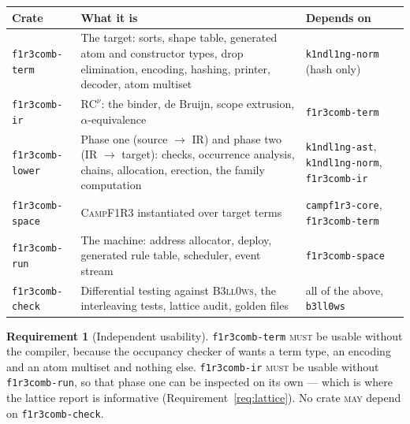 \documentclass[11pt,a4paper]{article}
\newcommand{\code}[1]{\texttt{#1}}
\newcommand{\Camp}{\textsc{CampF1R3}}
\newcommand{\Bell}{\textsc{B3ll0ws}}
\newcommand{\MUST}{\textsc{must}}
\newcommand{\MAY}{\textsc{may}}
\theoremstyle{definition}
\newtheorem{requirement}[definition]{Requirement}
\theoremstyle{plain}
\begin{document}
\begin{center}
\begin{tabularx}{\linewidth}{@{}l>{\raggedright\arraybackslash}Xl@{}}
\toprule
Crate & What it is & Depends on\\
\midrule
\code{f1r3comb-term} & The target: sorts, shape table, generated atom and
constructor types, drop elimination, encoding, hashing, printer, decoder,
atom multiset & \code{k1ndl1ng-norm} (hash only)\\
\code{f1r3comb-ir} & $\mathrm{RC}^{\nu}$: the binder, de Bruijn, scope
extrusion, $\alpha$-equivalence & \code{f1r3comb-term}\\
\code{f1r3comb-lower} & Phase one (source $\to$ IR) and phase two (IR $\to$
target): checks, occurrence analysis, chains, allocation, erection, the family
computation & \code{k1ndl1ng-ast}, \code{k1ndl1ng-norm},
\code{f1r3comb-ir}\\
\code{f1r3comb-space} & \Camp{} instantiated over target terms &
\code{campf1r3-core}, \code{f1r3comb-term}\\
\code{f1r3comb-run} & The machine: address allocator, deploy, generated rule
table, scheduler, event stream & \code{f1r3comb-space}\\
\code{f1r3comb-check} & Differential testing against \Bell, the interleaving
tests, lattice audit, golden files & all of the above, \code{b3ll0ws}\\
\bottomrule
\end{tabularx}
\end{center}

\begin{requirement}[Independent usability]\label{req:indep}
\code{f1r3comb-term} \MUST{} be usable without the compiler, because the
occupancy checker of \cite[\S6]{logic} wants a term type, an encoding and an
atom multiset and nothing else. \code{f1r3comb-ir} \MUST{} be usable without
\code{f1r3comb-run}, so that phase one can be inspected on its own --- which
is where the lattice report is informative
(Requirement~\ref{req:lattice}). No crate \MAY{} depend on
\code{f1r3comb-check}.
\end{requirement}
\end{document}

